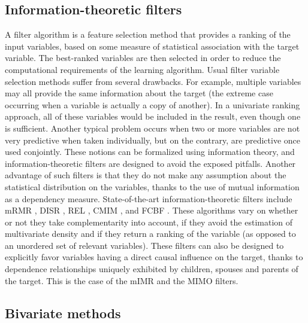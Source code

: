 \subsection{Information-theoretic filters}

A filter algorithm is a feature selection method that provides a ranking of the
input variables, based on some measure of statistical association with the
target variable. The best-ranked variables are then selected in order to reduce
the computational requirements of the learning algorithm. Usual filter variable
selection methods suffer from several drawbacks. For example, multiple variables
may all provide the same information about the target (the extreme case
occurring when a variable is actually a copy of another). In a univariate
ranking approach, all of these variables would be included in the result, even
though one is sufficient. Another typical problem occurs when two or more
variables are not very predictive when taken individually, but on the contrary,
are predictive once used conjointly. These notions can be formalized using
information theory, and information-theoretic filters are designed to avoid the
exposed pitfalls. Another advantage of such filters is that they do not make any
assumption about the statistical distribution on the variables, thanks to the
use of mutual information as a dependency measure. State-of-the-art
information-theoretic filters include mRMR \parencite{peng2005feature}, DISR
\parencite{meyer2008information}, REL \parencite{bell2000formalism}, CMIM
\parencite{fleuret2004fast}, and FCBF \parencite{yu2004efficient}. These
algorithms vary on whether or not they take complementarity into account, if
they avoid the estimation of multivariate density and if they return a ranking
of the variable (as opposed to an unordered set of relevant variables). These
filters can also be designed to explicitly favor variables having a direct
causal influence on the target, thanks to dependence relationships uniquely
exhibited by children, spouses and parents of the target. This is the case of
the mIMR \parencite{bontempi2010causal} and the MIMO
\parencite{bontempi2011multiple} filters.

\subsection{Bivariate methods}

